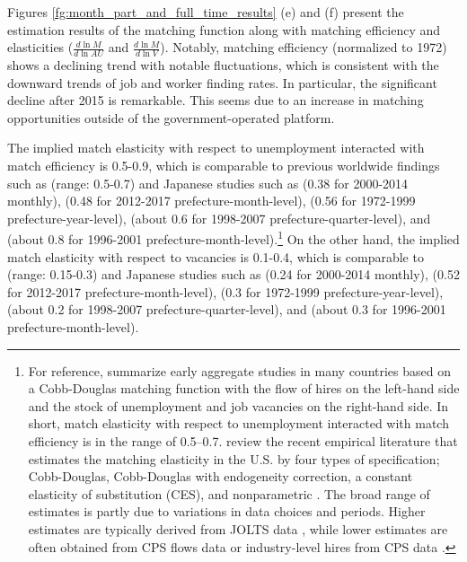 \documentclass[12pt]{article}
\begin{document}
Figures \ref{fg:month_part_and_full_time_results} (e) and (f) present the estimation results of the matching function along with matching efficiency and elasticities (\(\frac{d\ln M}{d\ln AU}\) and \(\frac{d\ln M}{d\ln V}\)). Notably, matching efficiency (normalized to 1972) shows a declining trend with notable fluctuations, which is consistent with the downward trends of job and worker finding rates. 
In particular, the significant decline after 2015 is remarkable.
This seems due to an increase in matching opportunities outside of the government-operated platform.

The implied match elasticity with respect to unemployment interacted with match efficiency is 0.5-0.9, which is comparable to previous worldwide findings such as \cite{petrongolo2001looking} (range: 0.5-0.7) and Japanese studies such as \cite{higashi2018spatial} (0.38 for 2000-2014 monthly), \cite{kawata2019} (0.48 for 2012-2017 prefecture-month-level), \cite{kano2005estimating} (0.56 for 1972-1999 prefecture-year-level), \cite{sasaki2007measuring} (about 0.6 for 1998-2007 prefecture-quarter-level), and \cite{kambayashi2006vacancy} (about 0.8 for 1996-2001 prefecture-month-level).\footnote{For reference, \cite{petrongolo2001looking} summarize early aggregate studies in many countries based on a Cobb-Douglas matching function with the flow of hires on the left-hand side and the stock of unemployment and job vacancies on the right-hand side. In short, match elasticity with respect to unemployment interacted with match efficiency is in the range of 0.5–0.7. \cite{bernstein2022matching} review the recent empirical literature that estimates the matching elasticity in the U.S. by four types of specification; Cobb-Douglas, Cobb-Douglas with endogeneity correction, a constant elasticity of substitution (CES), and nonparametric \citep{lange2020beyond}. The broad range of estimates is partly due to variations in data choices and periods. Higher estimates are typically derived from JOLTS data \citep{borowczyk2013accounting, csahin2014mismatch}, while lower estimates are often obtained from CPS flows data \citep{barnichon2015labor} or industry-level hires from CPS data \citep{csahin2014mismatch}.}
On the other hand, the implied match elasticity with respect to vacancies is 0.1-0.4, which is comparable to \cite{lange2020beyond} (range: 0.15-0.3) and Japanese studies such as \cite{higashi2018spatial} (0.24 for 2000-2014 monthly), \cite{kawata2019} (0.52 for 2012-2017 prefecture-month-level), \cite{kano2005estimating} (0.3 for 1972-1999 prefecture-year-level), \cite{sasaki2007measuring} (about 0.2 for 1998-2007 prefecture-quarter-level), and \cite{kambayashi2006vacancy} (about 0.3 for 1996-2001 prefecture-month-level).
\end{document}
